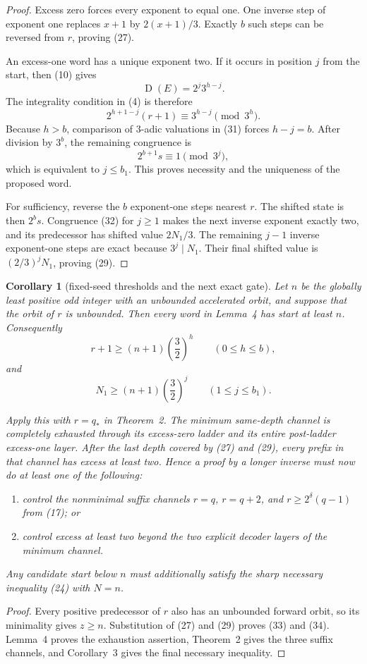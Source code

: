 \documentclass[11pt]{article}
\newtheorem{corollary}[theorem]{Corollary}
\newcommand{\sh}{\operatorname{D}}
\begin{document}
\begin{proof}
Excess zero forces every exponent to equal one.  One inverse step of
exponent one replaces $x+1$ by $2(x+1)/3$.  Exactly $b$ such steps can
be reversed from $r$, proving (27).

An excess-one word has a unique exponent two.  If it occurs in position
$j$ from the start, then (10) gives
\[
 \sh(E)=2^j3^{h-j}.
 \tag{30}
\]
The integrality condition in (4) is therefore
\[
 2^{h+1-j}(r+1)\equiv3^{h-j}\pmod {3^h}.
 \tag{31}
\]
Because $h>b$, comparison of $3$-adic valuations in (31) forces
$h-j=b$.  After division by $3^b$, the remaining congruence is
\[
 2^{b+1}s\equiv1\pmod {3^j},
 \tag{32}
\]
which is equivalent to $j\leq b_1$.  This proves necessity and the
uniqueness of the proposed word.

For sufficiency, reverse the $b$ exponent-one steps nearest $r$.  The
shifted state is then $2^bs$.  Congruence (32) for $j\geq1$ makes the
next inverse exponent exactly two, and its predecessor has shifted value
$2N_1/3$.  The remaining $j-1$ inverse exponent-one steps are exact
because $3^j\mid N_1$.  Their final shifted value is
$(2/3)^jN_1$, proving (29).
\end{proof}

\begin{corollary}[fixed-seed thresholds and the next exact gate]
Let $n$ be the globally least positive odd integer with an unbounded
accelerated orbit, and suppose that the orbit of $r$ is unbounded.  Then
every word in Lemma~4 has start at least $n$.  Consequently
\[
 r+1\geq(n+1)\left(\frac32\right)^h
 \qquad(0\leq h\leq b),
 \tag{33}
\]
and
\[
 N_1\geq(n+1)\left(\frac32\right)^j
 \qquad(1\leq j\leq b_1).
 \tag{34}
\]

Apply this with $r=q_*$ in Theorem~2.  The minimum same-depth channel is
completely exhausted through its excess-zero ladder and its entire
post-ladder excess-one layer.  After the last depth covered by (27) and
(29), every prefix in that channel has excess at least two.  Hence a
proof by a longer inverse must now do at least one of the following:
\begin{enumerate}
 \item control the nonminimal suffix channels $r=q$, $r=q+2$, and
 $r\geq2^\delta(q-1)$ from (17); or
 \item control excess at least two beyond the two explicit decoder
 layers of the minimum channel.
\end{enumerate}
Any candidate start below $n$ must additionally satisfy the sharp
necessary inequality (24) with $N=n$.
\end{corollary}

\begin{proof}
Every positive predecessor of $r$ also has an unbounded forward orbit,
so its minimality gives $z\geq n$.  Substitution of (27) and (29) proves
(33) and (34).  Lemma~4 proves the exhaustion assertion, Theorem~2 gives
the three suffix channels, and Corollary~3 gives the final necessary
inequality.
\end{proof}
\end{document}
